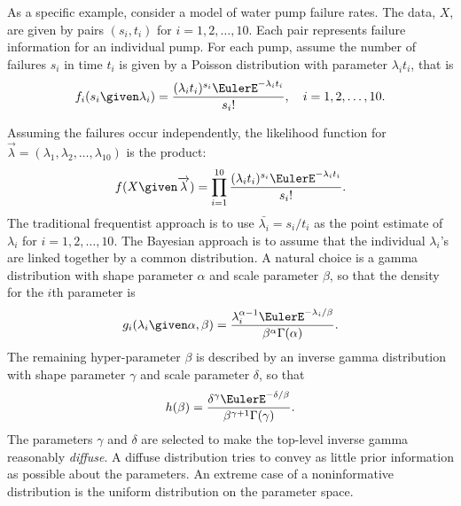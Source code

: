 \documentclass[12pt]{article}
\begin{document}
As a specific example, consider a model of water pump failure rates. The
data, \( X \), are given by pairs \( (s_i, t_i) \) for \( i = 1,2, \dots,
10 \).  Each pair represents failure information for an individual pump.
For each pump, assume the number of failures \( s_i \) in time \( t_i \)
is given by a Poisson distribution with parameter \( \lambda_i t_i \),
that is
\[
    f_i(s_i \given \lambda_i) = \frac{(\lambda_i t_i)^{s_i} \EulerE^{-\lambda_i
    t_i}}{s_i!}, \quad i = 1,2, \dots, 10.
\]

Assuming the failures occur independently, the likelihood function for \(
\overrightarrow{\lambda} = (\lambda_1, \lambda_2, \dots, \lambda_{10}) \)
is the product:
\[
    f(X \given \overrightarrow{\lambda}) = \prod\limits_{i=1}^{10} \frac
    {(\lambda_i t_i)^{s_i} \EulerE^{-\lambda_i t_i}}{s_i!}.
\] The traditional frequentist approach is to use \( \bar{\lambda_i} = s_i/t_i
\) as the point estimate of \( \lambda_i \) for \( i = 1,2, \dots, 10 \).
The Bayesian approach is to assume that the individual \( \lambda_i \)'s
are linked together by a common distribution.  A natural choice is a
gamma distribution with shape parameter \( \alpha \) and scale parameter
\( \beta \), so that the density for the \( i \)th parameter is
\[
    g_i(\lambda_i \given \alpha, \beta) = \frac{\lambda_i^ {\alpha-1}
    \EulerE^{-\lambda_i/\beta}}{\beta^{\alpha} \Gamma(\alpha)}.
\] The remaining hyper-parameter \( \beta \) is described by an inverse
gamma distribution%
with shape parameter \( \gamma \) and scale parameter \( \delta \), so
that
\[
    h(\beta) = \frac{\delta^{\gamma} \EulerE^{-\delta/\beta}}{\beta^{\gamma+1}
    \Gamma(\gamma)}.
\] The parameters \( \gamma \) and \( \delta \) are selected to make the
top-level inverse gamma reasonably \emph{diffuse}.  A diffuse
distribution%
tries to convey as little prior information as possible about the
parameters.  An extreme case of a noninformative distribution is the
uniform distribution on the parameter space.
\end{document}
